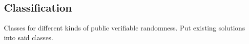 \subsection{Classification}
\label{sub:classification}
Classes for different kinds of public verifiable randomness.
Put existing solutions into said classes.


